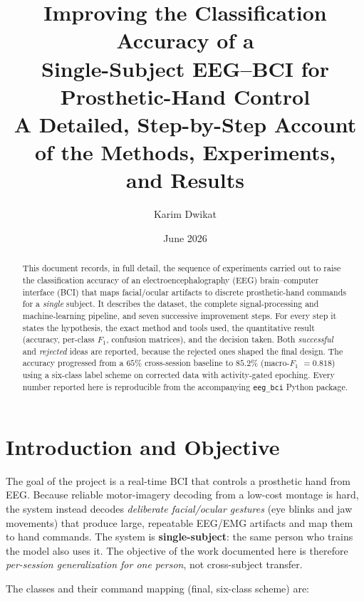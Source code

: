 \documentclass[11pt,a4paper]{article}
\title{\textbf{Improving the Classification Accuracy of a\\
Single-Subject EEG--BCI for Prosthetic-Hand Control}\\[4pt]
\large A Detailed, Step-by-Step Account of the Methods, Experiments,\\
and Results}
\author{Karim Dwikat}
\date{June 2026}
\newcommand{\fone}{$F_1$}
\newcommand{\code}[1]{\texttt{#1}}
\begin{document}
\maketitle

\begin{abstract}
\noindent
This document records, in full detail, the sequence of experiments carried out
to raise the classification accuracy of an electroencephalography (EEG)
brain--computer interface (BCI) that maps facial/ocular artifacts to discrete
prosthetic-hand commands for a \emph{single} subject. It describes the dataset,
the complete signal-processing and machine-learning pipeline, and seven
successive improvement steps. For every step it states the hypothesis, the exact
method and tools used, the quantitative result (accuracy, per-class \fone{},
confusion matrices), and the decision taken. Both \emph{successful} and
\emph{rejected} ideas are reported, because the rejected ones shaped the final
design. The accuracy progressed from a $65\%$ cross-session baseline to
$\mathbf{85.2\%}$ (macro-\fone{} $=0.818$) using a six-class label scheme on
corrected data with activity-gated epoching. Every number reported here is
reproducible from the accompanying \code{eeg\_bci} Python package.
\end{abstract}

\tableofcontents
\bigskip

\section{Introduction and Objective}
The goal of the project is a real-time BCI that controls a prosthetic hand from
EEG. Because reliable motor-imagery decoding from a low-cost montage is hard, the
system instead decodes \emph{deliberate facial/ocular gestures} (eye blinks and
jaw movements) that produce large, repeatable EEG/EMG artifacts and map them to
hand commands. The system is \textbf{single-subject}: the same person who trains
the model also uses it. The objective of the work documented here is therefore
\emph{per-session generalization for one person}, not cross-subject transfer.

The classes and their command mapping (final, six-class scheme) are:
\end{document}
